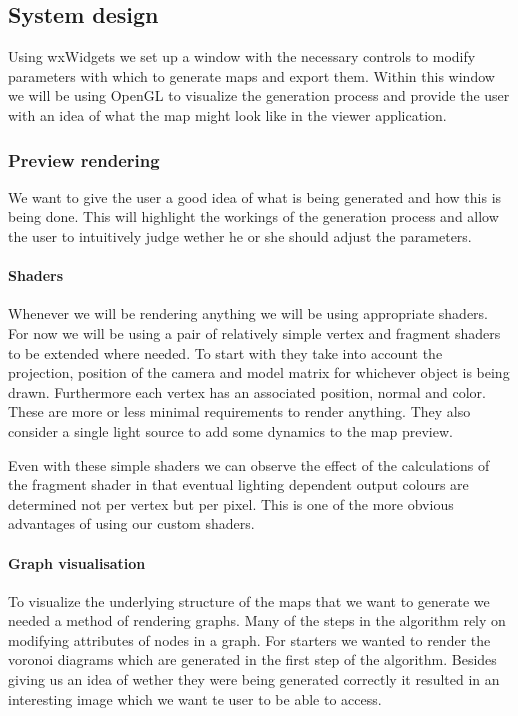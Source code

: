 
\subsection{System design}

Using wxWidgets we set up a window with the necessary controls to modify parameters with which to generate maps and export them. Within this window we will be using OpenGL to visualize the generation process and provide the user with an idea of what the map might look like in the viewer application.

\subsubsection{Preview rendering}

We want to give the user a good idea of what is being generated and how this is being done. This will highlight the workings of the generation process and allow the user to intuitively judge wether he or she should adjust the parameters.

\paragraph{Shaders}

Whenever we will be rendering anything we will be using appropriate shaders. For now we will be using a pair of relatively simple vertex and fragment shaders to be extended where needed. To start with they take into account the projection, position of the camera and model matrix for whichever object is being drawn. Furthermore each vertex has an associated position, normal and color. These are more or less minimal requirements to render anything. They also consider a single light source to add some dynamics to the map preview. 

Even with these simple shaders we can observe the effect of the calculations of the fragment shader in that eventual lighting dependent output colours are determined not per vertex but per pixel. This is one of the more obvious advantages of using our custom shaders.

\paragraph{Graph visualisation}

To visualize the underlying structure of the maps that we want to generate we needed a method of rendering graphs. Many of the steps in the algorithm rely on modifying attributes of nodes in a graph. For starters we wanted to render the voronoi diagrams which are generated in the first step of the algorithm. Besides giving us an idea of wether they were being generated correctly it resulted in an interesting image which we want te user to be able to access.

